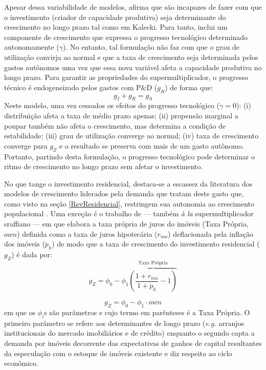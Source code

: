 Apesar dessa variabilidade de modelos, \textcite{dutt_observations_2018} afirma que são incapazes de fazer com que o investimento (criador de capacidade produtiva) seja determinante do crescimento no longo prazo tal como em Kalecki. Para tanto, inclui um componente de crescimento que expressa o progresso tecnológico determinado autonomamente ($\gamma$). No entanto, tal formulação não faz com que o grau de utilização convirja ao normal e que a taxa de crescimento seja determinada pelos gastos autônomos uma vez que essa nova variável afeta a capacidade produtiva no longo prazo. Para garantir as propriedades do supermultiplicador, o progresso técnico é endogeneizado pelos gastos com P\&D ($g_R$) de forma que:
$$
g_I + g_R = g_S
$$
Neste modelo, uma vez cessados os efeitos do progresso tecnológico ($\dot \gamma = 0$): 
	(i) distribuição afeta a taxa de médio prazo apenas; 
	(ii) propensão marginal a poupar também não afeta o crescimento, mas determina a condição de estabilidade; 
	(iii) grau de utilização converge ao normal; 
	(iv) taxa de crescimento converge para $g_Z$ e o resultado se preserva com mais de um gasto autônomo. Portanto, partindo desta formulação, o progresso tecnológico pode determinar o ritmo de crescimento no longo prazo sem afetar o investimento.

No que tange o investimento residencial, destaca-se a escassez da literatura dos modelos de crescimento liderados pela demanda que tratam deste gasto que, como visto na seção \ref{RevResidencial}, restringem sua autonomia ao crescimento populacional \cite{gowans_introducing_2014}. Uma exceção é o trabalho de \textcite{teixeira_crescimento_2015} ---  também \textit{à la} supermultiplicador sraffiano --- em que elabora a taxa própria de juros do imóveis (Taxa Própria, $own$) definida como a taxa de juros hipotecária ($r_{mo}$) deflacionada pela inflação dos imóveis ({$\dot p_h$}) de modo que a taxa de crescimento do investimento residencial ($g_Z$) é dada por:
$$
g_Z = \phi_0 - \phi_1 \overbrace{\left(\frac{1+r_{mo}}{1+\dot p_h} - 1\right)}^{\text{Taxa Própria}}
$$

\begin{equation}
\label{tx_Propria}
g_Z = \phi_0 - \phi_1\cdot own
\end{equation}
em que os $\phi_i$s são parâmetros e cujo termo em parênteses é a Taxa Própria. 
O primeiro parâmetro se refere aos determinantes de longo prazo (\textit{e.g.} arranjos institucionais do mercado imobiliários e de crédito) enquanto o segundo capta a demanda por imóveis decorrente das expectativas de ganhos de capital resultantes da especulação com o estoque de imóveis existente e diz respeito ao ciclo econômico.

